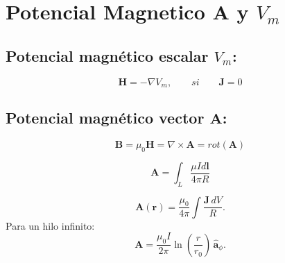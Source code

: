 \documentclass[11pt]{article}
\begin{document}
\section{Potencial Magnetico \(\mathbf{A}\) y $V_m$ }
\subsection{Potencial magnético escalar $V_{m}$:}

\[\mathbf{H}= -\nabla V_m,\qquad si \qquad\mathbf{J} = 0\]

\subsection{Potencial magnético vector \(\mathbf{A}\):}

\[
\mathbf{B} =\mu_0\mathbf{H}= \nabla \times \mathbf{A} = rot(\mathbf{A})
\]

\[
\mathbf{A}= \int_{L}\frac{\mu Id\mathbf{l}}{4\pi R}
\]

\[
\mathbf{A}(\mathbf{r})=\frac{\mu_0}{4\pi}\int
\frac{\mathbf{J}\,dV}{R}.
\]
Para un hilo infinito:
\[
\mathbf{A}= \frac{\mu_0 I}{2\pi}\ln\!\left(\frac{r}{r_0}\right)\,
\hat{\boldsymbol{a}}_{\phi}.
\]

\newpage
\end{document}
